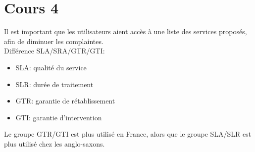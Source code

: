 \section{Cours 4}
Il est important que les utilisateurs aient acc\`es \`a une liste des services propos\'es, afin de diminuer les
complaintes.\\
Diff\'erence SLA/SRA/GTR/GTI:
\begin{itemize}
  \item SLA: qualit\'e du service
  \item SLR: dur\'ee de traitement
  \item GTR: garantie de r\'etablissement
  \item GTI: garantie d'intervention
\end{itemize}
Le groupe GTR/GTI est plus utilis\'e en France, alors que le groupe SLA/SLR est plus utilis\'e chez les anglo-saxons.
